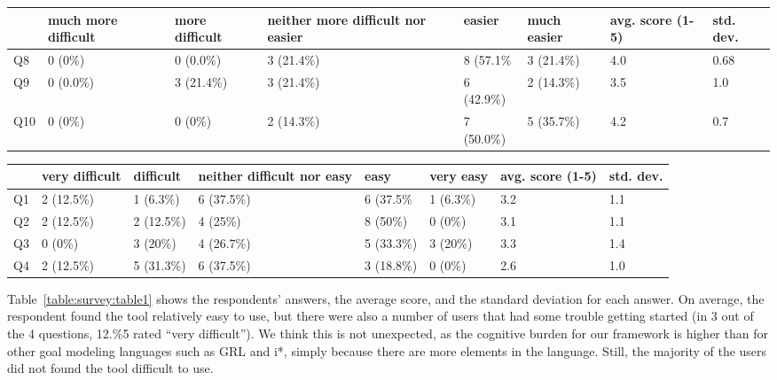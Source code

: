 {\begin{table*}[t]
\centering
\begin{tabularx}{0.95\textwidth}{l|l|l|l|l|l|l|l}
& much more difficult & more difficult & neither more difficult nor easier & easier & much easier & avg. score (1-5) & std. dev.\\
\hline
Q8 & 0 (0\%) & 0 (0.0\%) & 3 (21.4\%) & 8 (57.1\% & 3 (21.4\%) & 4.0 & 0.68\\
Q9 & 0 (0.0\%) & 3 (21.4\%) & 3 (21.4\%) & 6 (42.9\%) & 2 (14.3\%) & 3.5 & 1.0\\
Q10 & 0 (0\%) & 0 (0\%) & 2 (14.3\%) & 7 (50.0\%) & 5 (35.7\%) & 4.2 & 0.7
\end{tabularx}
\caption{Participant ratings of whether the additions of RationalGRL make reasoning about a goal model easier}
\label{table:survey:table2}
\end{table*}

\begin{table*}[t]
\centering
\begin{tabularx}{0.95\textwidth}{l|l|l|l|l|l|l|l}
& very difficult & difficult & neither difficult nor easy & easy & very easy & avg. score (1-5) & std. dev.\\
\hline
Q1 & 2 (12.5\%) & 1 (6.3\%) & 6 (37.5\%) & 6 (37.5\% & 1 (6.3\%) & 3.2 & 1.1\\
Q2 & 2 (12.5\%) & 2 (12.5\%) & 4 (25\%) & 8 (50\%) & 0 (0\%) & 3.1 & 1.1\\
Q3 & 0 (0\%) & 3 (20\%) & 4 (26.7\%) & 5 (33.3\%) & 3 (20\%) & 3.3 & 1.4\\
Q4 & 2 (12.5\%) & 5 (31.3\%) & 6 (37.5\%) & 3 (18.8\%) & 0 (0\%) & 2.6 & 1.0
\end{tabularx}
\caption{User scores for the usability of the RationalGRL tool}
\label{table:survey:table1}
\end{table*}

Table~\ref{table:survey:table1} shows the respondents' answers, the average score, and the standard deviation for each answer. On average, the respondent found the tool relatively easy to use, but there were also a number of users that had some trouble getting started (in 3 out of the 4 questions, 12.\%5 rated ``very difficult''). We think this is not unexpected, as the cognitive burden for our framework is higher than for other goal modeling languages such as GRL and i*, simply because there are more elements in the language. Still, the majority of the users did not found the tool difficult to use.

}
